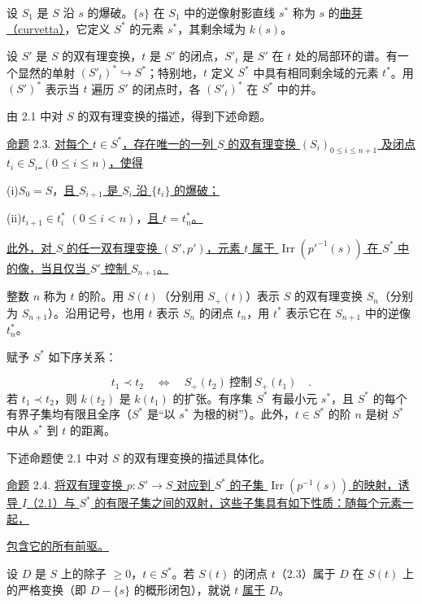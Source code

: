 设 $S_1$ 是 $S$ 沿 $s$ 的爆破。$\{s\}$ 在 $S_1$ 中的逆像射影直线 $s^*$ 称为 $s$ 的\underline{曲芽（curvetta）}，它定义 $S^*$ 的元素 $s^*$，其剩余域为 $k(s)$。

设 $S'$ 是 $S$ 的双有理变换，$t$ 是 $S'$ 的闭点，$S'_t$ 是 $S'$ 在 $t$ 处的局部环的谱。有一个显然的单射 $(S'_t)^*\hookrightarrow S^*$；特别地，$t$ 定义 $S^*$ 中具有相同剩余域的元素 $t^*$。用 $(S')^*$ 表示当 $t$ 遍历 $S'$ 的闭点时，各 $(S'_t)^*$ 在 $S^*$ 中的并。

由 2.1 中对 $S$ 的双有理变换的描述，得到下述命题。


\underline{命题} 2.3. \underline{对每个 $t\in S^*$，存在唯一的一列 $S$ 的双有理变换 $(S_i)_{0\leq i\leq n+1}$ 及闭点 $t_i\in S_i$ $(0\leq i\leq n)$，使得}

(i)\quad $S_0=S$，\underline{且 $S_{i+1}$ 是 $S_i$ 沿 $\{t_i\}$ 的爆破；}

(ii)\quad $t_{i+1}\in t_i^*$ $(0\leq i<n)$，\underline{且 $t=t_n^*$。}

\underline{此外，对 $S$ 的任一双有理变换 $(S',p')$，元素 $t$ 属于 $\operatorname{Irr}(p'^{-1}(s))$ 在 $S^*$ 中的像，当且仅当 $S'$ 控制 $S_{n+1}$。}

整数 $n$ 称为 $t$ 的阶。用 $S(t)$（分别用 $S_+(t)$）表示 $S$ 的双有理变换 $S_n$（分别为 $S_{n+1}$）。沿用记号，也用 $t$ 表示 $S_n$ 的闭点 $t_n$，用 $t^*$ 表示它在 $S_{n+1}$ 中的逆像 $t_n^*$。

赋予 $S^*$ 如下序关系：

\begin{equation*}
t_1\prec t_2
\quad\Longleftrightarrow\quad
S_+(t_2)\ \text{控制}\ S_+(t_1) \quad .
\end{equation*}
若 $t_1\prec t_2$，则 $k(t_2)$ 是 $k(t_1)$ 的扩张。有序集 $S^*$ 有最小元 $s^*$，且 $S^*$ 的每个有界子集均有限且全序（$S^*$ 是“以 $s^*$ 为根的树”）。此外，$t\in S^*$ 的阶 $n$ 是树 $S^*$ 中从 $s^*$ 到 $t$ 的距离。

下述命题使 2.1 中对 $S$ 的双有理变换的描述具体化。

\underline{命题} 2.4. \underline{将双有理变换 $p:S'\to S$ 对应到 $S^*$ 的子集 $\operatorname{Irr}(p^{-1}(s))$ 的映射，诱导 $I$（2.1）与 $S^*$ 的有限子集之间的双射，这些子集具有如下性质：随每个元素一起，}


\underline{包含它的所有前驱。}

设 $D$ 是 $S$ 上的除子 $\geq0$，$t\in S^*$。若 $S(t)$ 的闭点 $t$（2.3）属于 $D$ 在 $S(t)$ 上的严格变换（即 $D-\{s\}$ 的概形闭包），就说 $t$ \underline{属于} $D$。

